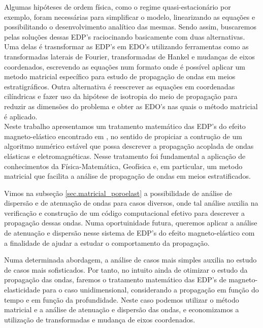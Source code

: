 Algumas hip\'oteses de ordem f\'isica, como o regime quasi-estacion\'ario por exemplo, foram necess\'arias para simplificar o modelo, linearizando as equa\c{c}\~oes e possibilitando o desenvolvimento anal\'itico das mesmas. Sendo assim, buscaremos pelas solu\c{c}\~oes dessas EDP's raciocinando basicamente com duas alternativas. Uma delas \'e trasnsformar as EDP's em EDO's utilizando ferramentas como as transformadas laterais de Fourier, transformadas de Hankel e mudan\c{c}as de eixos coordenados, escrevendo as equa\c{c}\~oes num formato onde \'e poss\'ivel aplicar um metodo matricial espec\'ifico para estudo de propaga\c{c}\~ao de ondas em meios estratigr\'aficos. Outra alternativa \'e reescrever as equa\c{c}\~oes em coordenadas cil\'indricas e fazer uso da hip\'otese de isotropia do meio de propaga\c{c}\~ao para reduzir as dimens\~oes do problema e obter as EDO's nas quais o m\'etodo matricial \'e aplicado.
\\
Neste trabalho apresentamos um tratamento matem\'atico das EDP's do efeito magneto-el\'astico encontrado em \cite{pinho_2018} , no sentido de propiciar a contru\c{c}\~ao de um algoritmo num\'erico est\'avel que possa descrever a propaga\c{c}\~ao acoplada de ondas el\'asticas e eletromagn\'eticas. Nesse tratamento foi fundamental a aplica\c{c}\~ao de conhecimentos da F\'isica-Matem\'atica, Geof\'isica e, em particular, um metodo matricial que facilita a an\'alise de propaga\c{c}\~ao de ondas em meios estratificados.

Vimos na subse\c{c}\~ao \ref{sec.matricial_poroelast} a possibilidade de an\'alise de dispers\~ao e de atenua\c{c}\~ao de ondas para casos diversos, onde tal an\'alise auxilia na verifica\c{c}\~ao e constru\c{c}\~ao de um c\'odigo computacional efetivo para descrever a propaga\c{c}\~ao dessas ondas. Numa oportuinidade futura, queremos aplicar a an\'alise de atenua\c{c}\~ao e dispers\~ao nesse sistema de EDP's do efeito magneto-el\'astico com a finalidade de ajudar a estudar o comportamento da propaga\c{c}\~ao.

Numa determinada abordagem, a an\'alise de casos mais simples auxilia no estudo de casos mais sofisticados. Por tanto, no intuito ainda de otimizar o estudo da propaga\c{c}\~ao das ondas, faremos o tratamento matem\'atico das EDP's de magneto-elasticidade para o caso unidimensional, considerando a propaga\c{c}\~ao em fun\c{c}\~ao do tempo e em fun\c{c}\~ao da profundidade. Neste caso podemos utilizar o m\'etodo matricial e a an\'alise de atenua\c{c}\~ao e dispers\~ao das ondas, e economizamos a utiliza\c{c}\~ao de transformadas e mudan\c{c}a de eixos coordenados.

